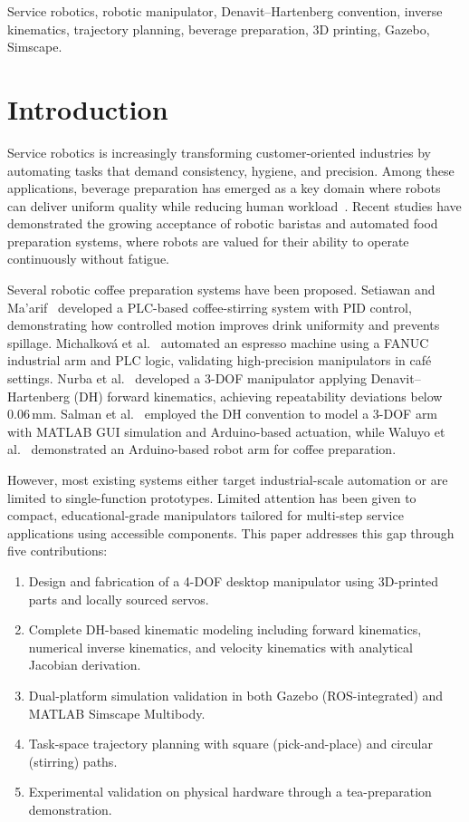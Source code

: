 \documentclass[conference]{IEEEtran}
\begin{document}
\begin{IEEEkeywords}
Service robotics, robotic manipulator, Denavit--Hartenberg convention, inverse kinematics, trajectory planning, beverage preparation, 3D printing, Gazebo, Simscape.
\end{IEEEkeywords}

\section{Introduction}

Service robotics is increasingly transforming customer-oriented industries by automating tasks that demand consistency, hygiene, and precision. Among these applications, beverage preparation has emerged as a key domain where robots can deliver uniform quality while reducing human workload~\cite{park2023}. Recent studies have demonstrated the growing acceptance of robotic baristas and automated food preparation systems, where robots are valued for their ability to operate continuously without fatigue.

Several robotic coffee preparation systems have been proposed. Setiawan and Ma'arif~\cite{setiawan2021} developed a PLC-based coffee-stirring system with PID control, demonstrating how controlled motion improves drink uniformity and prevents spillage. Michalkov\'{a} et al.~\cite{michalkova2024} automated an espresso machine using a FANUC industrial arm and PLC logic, validating high-precision manipulators in caf\'{e} settings. Nurba et al.~\cite{nurba2022} developed a 3-DOF manipulator applying Denavit--Hartenberg (DH) forward kinematics, achieving repeatability deviations below 0.06\,mm. Salman et al.~\cite{salman2021} employed the DH convention to model a 3-DOF arm with MATLAB GUI simulation and Arduino-based actuation, while Waluyo et al.~\cite{waluyo2021} demonstrated an Arduino-based robot arm for coffee preparation.

However, most existing systems either target industrial-scale automation or are limited to single-function prototypes. Limited attention has been given to compact, educational-grade manipulators tailored for multi-step service applications using accessible components. This paper addresses this gap through five contributions:
\begin{enumerate}
\item Design and fabrication of a 4-DOF desktop manipulator using 3D-printed parts and locally sourced servos.
\item Complete DH-based kinematic modeling including forward kinematics, numerical inverse kinematics, and velocity kinematics with analytical Jacobian derivation.
\item Dual-platform simulation validation in both Gazebo (ROS-integrated) and MATLAB Simscape Multibody.
\item Task-space trajectory planning with square (pick-and-place) and circular (stirring) paths.
\item Experimental validation on physical hardware through a tea-preparation demonstration.
\end{enumerate}
\end{document}
